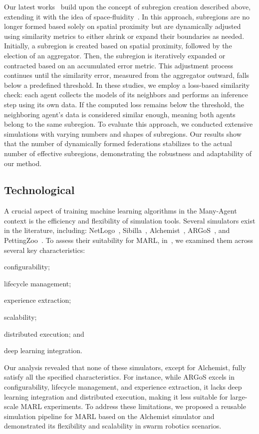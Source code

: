 \documentclass[12pt]{article}
\begin{document}
Our latest works~\cite{DBLP:journals/corr/abs-2407-12410,DBLP:journals/iot/DominiAFVE2025} build upon the concept of subregion 
 creation described above, extending it with the idea of space-fluidity~\cite{DBLP:journals/lmcs/CasadeiMPVZ23}. 
% 
In this approach, subregions are no longer formed based solely on spatial proximity but are dynamically adjusted using 
 similarity metrics to either shrink or expand their boundaries as needed.
%
Initially, a subregion is created based on spatial proximity, followed by the election of an aggregator. 
%
Then, the subregion is iteratively expanded or contracted based on an accumulated error metric. 
%
This adjustment process continues until the similarity error, measured from the aggregator outward, 
 falls below a predefined threshold.
%
In these studies, we employ a loss-based similarity check: each agent collects the models of its neighbors and performs an inference 
 step using its own data. 
% 
If the computed loss remains below the threshold, the neighboring agent's data is considered similar enough, meaning both agents belong 
 to the same subregion.
%
To evaluate this approach, we conducted extensive simulations with varying numbers and shapes of subregions. 
%
Our results show that the number of dynamically formed federations stabilizes to the actual number of effective subregions, 
 demonstrating the robustness and adaptability of our method.

\subsection{Technological}

A crucial aspect of training machine learning algorithms in the Many-Agent context is the efficiency and flexibility of simulation tools. 
%
Several simulators exist in the literature, including: NetLogo~\cite{tisue2004netlogo}, Sibilla~\cite{DBLP:journals/scp/GiudiceMQRL24}, 
 Alchemist~\cite{Pianini_2013}, ARGoS~\cite{DBLP:journals/swarm/PinciroliTOPBBMFCDBGD12}, 
 and PettingZoo~\cite{DBLP:conf/nips/TerryBGJHSSDHPW21}. 
% 
To assess their suitability for MARL, in~\cite{DBLP:conf/dsrt/DominiAPV24},  we examined them across several key characteristics: 
\begin{enumerate*}[label=(\roman*)]
	\item configurability;
	\item lifecycle management; 
	\item experience extraction;
	\item scalability;
	\item distributed execution; and
	\item deep learning integration.
 \end{enumerate*}
%
Our analysis revealed that none of these simulators, except for Alchemist, fully satisfy all the specified characteristics. 
%
For instance, while ARGoS excels in configurability, lifecycle management, and experience extraction, 
 it lacks deep learning integration and distributed execution, making it less suitable for large-scale MARL experiments.
%
To address these limitations, we proposed a reusable simulation pipeline for MARL based on the Alchemist simulator and 
 demonstrated its flexibility and scalability in swarm robotics scenarios.
\end{document}
